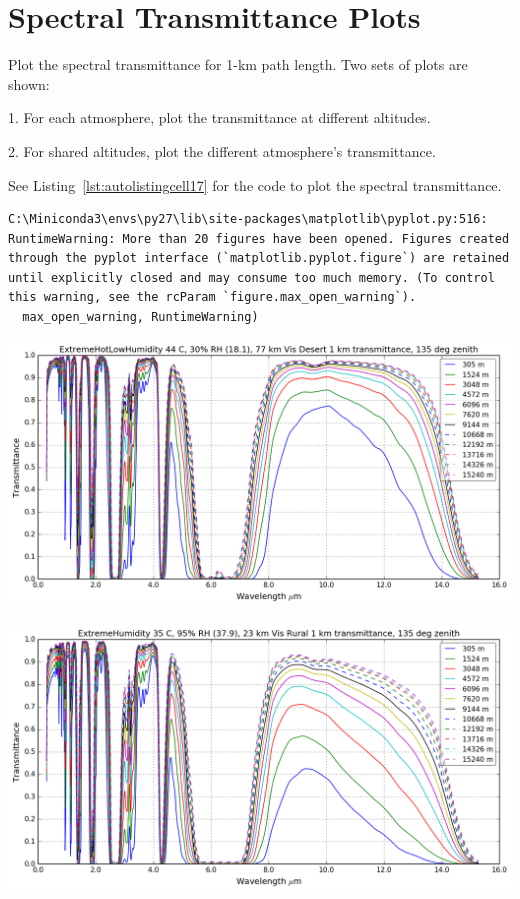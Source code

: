 \documentclass{workpackage}
\begin{document}
\section{Spectral Transmittance Plots}
\label{sec:SpectralTransmittancePlots}

Plot the spectral transmittance for 1-km path length. Two sets of plots are shown: 


 1. For each atmosphere, plot the transmittance at different altitudes. 


 2. For shared altitudes, plot the different atmosphere's transmittance.




See Listing~\ref{lst:autolistingcell17} for the code to plot the spectral transmittance.


\begin{lstlisting}[style=outcellstyle]
C:\Miniconda3\envs\py27\lib\site-packages\matplotlib\pyplot.py:516: RuntimeWarning: More than 20 figures have been opened. Figures created through the pyplot interface (`matplotlib.pyplot.figure`) are retained until explicitly closed and may consume too much memory. (To control this warning, see the rcParam `figure.max_open_warning`).
  max_open_warning, RuntimeWarning)

\end{lstlisting}

\begin{center}
\includegraphics{./pic/Analyse-Standard-Atmospheres_17_1.png}
\end{center}

\begin{center}
\includegraphics{./pic/Analyse-Standard-Atmospheres_17_2.png}
\end{center}
\end{document}
